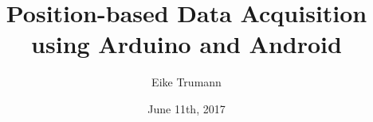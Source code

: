 \documentclass[11pt,twoside,a4paper]{report}
\begin{document}

\title{Position-based Data Acquisition using Arduino and Android}
\author{Eike Trumann}
\date{June 11th, 2017}
\makecntitle


\cleardoublepage




\tableofcontents













\appendix


\nocite{9783836236485}
\nocite{9783836242004}
\nocite{Ali2016}
\nocite{AndroidAPI}
\nocite{AppCompat}
\nocite{ATmega328}
\nocite{HC-05}
\nocite{JavaSpec}
\nocite{FallDetector}
\nocite{so1}
\nocite{so2}
\nocite{so3}


\listoffigures







\cnprintindex

\end{document}
